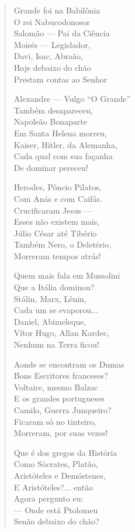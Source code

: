\begin{verse}
Grande foi na Babilônia \\
O rei Nabucodonosor \\
Salomão ---  Pai da Ciência \\
Moisés ---  Legislador, \\
Davi, Isac, Abraão, \\
Hoje debaixo do chão \\
Prestam contas ao Senhor 

Alexandre ---  Vulgo ``O Grande'' \\
Também desapareceu, \\
Napoleão Bonaparte \\
Em Santa Helena morreu, \\
Kaiser, Hitler, da Alemanha, \\
Cada qual com sua façanha \\
De dominar pereceu! 

Herodes, Pôncio Pilatos, \\
Com Anás e com Caifás. \\
Crucificaram Jesus ---\\
Esses não existem mais, \\
Júlio César até Tibério \\
Também Nero, o Deletério, \\
Morreram tempos atrás! 
\pagebreak

Quem mais fala em Mussolini \\
Que a Itália dominou? \\
Stálin, Marx, Lênin, \\
Cada um se evaporou... \\
Daniel, Abimeleque, \\
Vítor Hugo, Allan Kardec, \\
Nenhum na Terra ficou! 

Aonde se encontram os Dumas \\
Bons Escritores franceses? \\
Voltaire, mesmo Balzac \\
E os grandes portugueses \\
Camilo, Guerra Junqueiro? \\
Ficaram só no tinteiro, \\
Morreram, por suas vezes! 

Que é dos gregos da História \\
Como Sócrates, Platão, \\
Aristóteles e Demóstenes,\\
E Aristóteles?... então \\
Agora pergunto eu: \\
---  Onde está Ptolomeu \\
Senão debaixo do chão? 


\end{verse}
